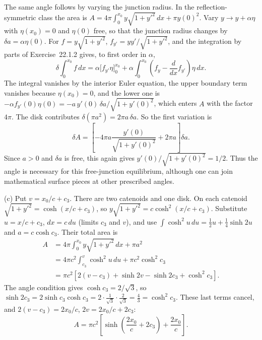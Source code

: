 The same angle follows by varying the junction radius. In the
reflection-symmetric class the area is
$A=4\pi\int_0^{x_0}y\sqrt{1+y'^2}\,dx+\pi y(0)^2$.
Vary $y\to y+\alpha\eta$ with $\eta(x_0)=0$ and $\eta(0)$ free, so
that the junction radius changes by $\delta a=\alpha\eta(0)$. For
$f=y\sqrt{1+y'^2}$, $f_{y'}=yy'/\sqrt{1+y'^2}$, and the integration by
parts of Exercise~22.1.2 gives, to first order in $\alpha$,
\[
\delta\int_0^{x_0}f\,dx=\alpha\bigl[f_{y'}\eta\bigr]_0^{x_0}
+\alpha\int_0^{x_0}\left(f_y-\frac{d}{dx}f_{y'}\right)\eta\,dx.
\]
The integral vanishes by the interior Euler equation, the upper
boundary term vanishes because $\eta(x_0)=0$, and the lower one is
$-\alpha f_{y'}(0)\eta(0)=-a\,y'(0)\,\delta a/\sqrt{1+y'(0)^2}$,
which enters $A$ with the factor $4\pi$. The disk contributes
$\delta(\pi a^2)=2\pi a\,\delta a$. So the first variation is
\[
 \delta A=\left[-4\pi a\frac{y'(0)}{\sqrt{1+y'(0)^2}}
                    +2\pi a\right]\delta a.
\]
Since $a>0$ and $\delta a$ is free, this again gives
$y'(0)/\sqrt{1+y'(0)^2}=1/2$. Thus the angle is necessary for
this free-junction equilibrium, although one can join mathematical
surface pieces at other prescribed angles.

(c) Put $v=x_0/c+c_3$. There are two catenoids and one disk. On each
catenoid $\sqrt{1+y'^2}=\cosh(x/c+c_3)$, so
$y\sqrt{1+y'^2}=c\cosh^2(x/c+c_3)$. Substitute $u=x/c+c_3$,
$dx=c\,du$ (limits $c_3$ and $v$), and use
$\int\cosh^2u\,du=\tfrac12u+\tfrac14\sinh2u$ and $a=c\cosh c_3$.
Their total area is
\[
\begin{aligned}
A&=4\pi\int_0^{x_0}y\sqrt{1+y'^2}\,dx+\pi a^2\\
&=4\pi c^2\int_{c_3}^{v}\cosh^2u\,du+\pi c^2\cosh^2c_3\\
&=\pi c^2[2(v-c_3)+\sinh2v-\sinh2c_3+\cosh^2c_3].
\end{aligned}
\]
The angle condition gives
$\cosh c_3=2/\sqrt3$, so
$\sinh2c_3=2\sinh c_3\cosh c_3=2\cdot\frac1{\sqrt3}\cdot\frac2{\sqrt3}
=\frac43=\cosh^2c_3$. These last terms cancel, and
$2(v-c_3)=2x_0/c$, $2v=2x_0/c+2c_3$:
\[
\boxed{A=\pi c^2\left[
\sinh\left(\frac{2x_0}{c}+2c_3\right)+\frac{2x_0}{c}
\right]}.
\]


